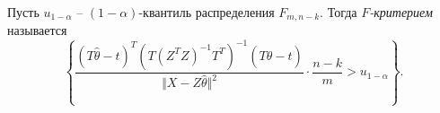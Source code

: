 \begin{definition}
    Пусть $\displaystyle u_{1-\alpha }$ -- $\displaystyle ( 1-\alpha )$-квантиль распределения $\displaystyle F_{m,n-k}$. Тогда $\displaystyle F$\textit{-критерием} называется
    \begin{equation*}
        \left\{\dfrac{( T\hat{\theta } -t)^{T}\left( T\left( Z^{T} Z\right)^{-1} T^{T}\right)^{-1}( T\hat{\theta } -t)}{\Vert X-Z\hat{\theta }\Vert ^{2}} \cdotp \dfrac{n-k}{m}  >u_{1-\alpha }\right\} .
    \end{equation*}
\end{definition}